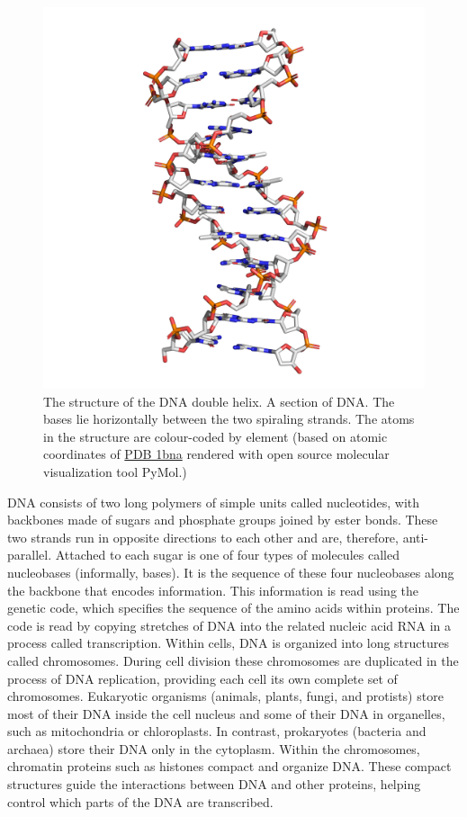 \begin{figure}

{\centering \includegraphics[width=0.7\linewidth]{./figures/dna/dna_licorice} 

}

\caption{The structure of the DNA double helix. A section of DNA. The bases lie horizontally between the two spiraling strands. The atoms in the structure are colour-coded by element (based on atomic coordinates of \href{https://www.rcsb.org/structure/1bna}{PDB 1bna} rendered with open source molecular visualization tool PyMol.)}\label{fig:structuredna}
\end{figure}

DNA consists of two long polymers of simple units called nucleotides, with backbones made of sugars and phosphate groups joined by ester bonds. These two strands run in opposite directions to each other and are, therefore, anti-parallel. Attached to each sugar is one of four types of molecules called nucleobases (informally, bases). It is the sequence of these four nucleobases along the backbone that encodes information. This information is read using the genetic code, which specifies the sequence of the amino acids within proteins. The code is read by copying stretches of DNA into the related nucleic acid RNA in a process called transcription. Within cells, DNA is organized into long structures called chromosomes. During cell division these chromosomes are duplicated in the process of DNA replication, providing each cell its own complete set of chromosomes. Eukaryotic organisms (animals, plants, fungi, and protists) store most of their DNA inside the cell nucleus and some of their DNA in organelles, such as mitochondria or chloroplasts. In contrast, prokaryotes (bacteria and archaea) store their DNA only in the cytoplasm. Within the chromosomes, chromatin proteins such as histones compact and organize DNA. These compact structures guide the interactions between DNA and other proteins, helping control which parts of the DNA are transcribed.

